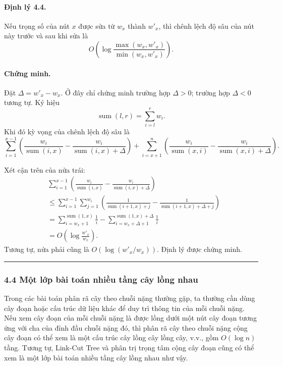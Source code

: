 \documentclass[11pt]{article}
\newcommand{\qedmark}{\hfill\rule{0.7ex}{0.7ex}}
\begin{document}
\paragraph{Định lý 4.4.}
Nếu trọng số của nút \(x\) được sửa từ \(w_x\) thành \(w'_x\), thì chênh lệch
độ sâu của nút này trước và sau khi sửa là
\[
  O\left(\log\frac{\max(w_x,w'_x)}{\min(w_x,w'_x)}\right).
\]

\paragraph{Chứng minh.}
Đặt \(\Delta=w'_x-w_x\). Ở đây chỉ chứng minh trường hợp \(\Delta>0\); trường
hợp \(\Delta<0\) tương tự. Ký hiệu
\[
  \operatorname{sum}(l,r)=\sum_{i=l}^{r}w_i.
\]
Khi đó kỳ vọng của chênh lệch độ sâu là
\[
  \sum_{i=1}^{x-1}
  \left(\frac{w_i}{\operatorname{sum}(i,x)}
  -\frac{w_i}{\operatorname{sum}(i,x)+\Delta}\right)
  +
  \sum_{i=x+1}^{n}
  \left(\frac{w_i}{\operatorname{sum}(x,i)}
  -\frac{w_i}{\operatorname{sum}(x,i)+\Delta}\right).
\]

Xét cận trên của nửa trái:
\[
\begin{aligned}
  &\sum_{i=1}^{x-1}
  \left(\frac{w_i}{\operatorname{sum}(i,x)}
  -\frac{w_i}{\operatorname{sum}(i,x)+\Delta}\right)\\
  &\le
  \sum_{i=1}^{x-1}\sum_{j=1}^{w_i}
  \left(
  \frac{1}{\operatorname{sum}(i+1,x)+j}
  -\frac{1}{\operatorname{sum}(i+1,x)+\Delta+j}
  \right)\\
  &=\sum_{i=w_x+1}^{\operatorname{sum}(1,x)}\frac{1}{i}
  -\sum_{i=w_x+\Delta+1}^{\operatorname{sum}(1,x)+\Delta}\frac{1}{i}\\
  &=O\left(\log\frac{w'_x}{w_x}\right).
\end{aligned}
\]
Tương tự, nửa phải cũng là \(O(\log(w'_x/w_x))\). Định lý được chứng minh.
\qedmark

\subsubsection*{4.4 Một lớp bài toán nhiều tầng cây lồng nhau}

Trong các bài toán phân rã cây theo chuỗi nặng thường gặp, ta thường cần dùng
cây đoạn hoặc cấu trúc dữ liệu khác để duy trì thông tin của mỗi chuỗi nặng.
Nếu xem cây đoạn của mỗi chuỗi nặng là được lồng dưới một nút cây đoạn tương
ứng với cha của đỉnh đầu chuỗi nặng đó, thì phân rã cây theo chuỗi nặng cộng
cây đoạn có thể xem là một cấu trúc cây lồng cây lồng cây, v.v., gồm
\(O(\log n)\) tầng. Tương tự, Link-Cut Tree và phân trị trọng tâm cộng cây đoạn
cũng có thể xem là một lớp bài toán nhiều tầng cây lồng nhau như vậy.
\end{document}
